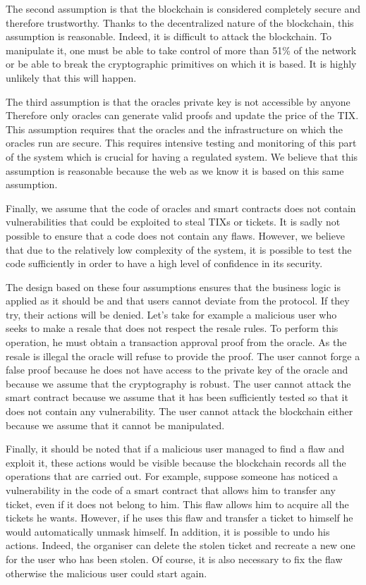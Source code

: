 \documentclass[a4paper,11pt,oneside]{report}
\begin{document}
The second assumption is that the blockchain is considered completely secure and therefore trustworthy. Thanks to the decentralized nature of the blockchain, this assumption is reasonable. Indeed, it is difficult to attack the blockchain. To manipulate it, one must be able to take control of more than 51\% of the network or be able to break the cryptographic primitives on which it is based. It is highly unlikely that this will happen.

The third assumption is that the oracles private key is not accessible by anyone Therefore only oracles can generate valid proofs and update the price of the TIX. This assumption requires that the oracles and the infrastructure on which the oracles run are secure. This requires intensive testing and monitoring of this part of the system which is crucial for having a regulated system. We believe that this assumption is reasonable because the web as we know it is based on this same assumption.

Finally, we assume that the code of oracles and smart contracts does not contain vulnerabilities that could be exploited to steal TIXs or tickets. It is sadly not possible to ensure that a code does not contain any flaws. However, we believe that due to the relatively low complexity of the system, it is possible to test the code sufficiently in order to have a high level of confidence in its security.

The design based on these four assumptions ensures that the business logic is applied as it should be and that users cannot deviate from the protocol. If they try, their actions will be denied. Let's take for example a malicious user who seeks to make a resale that does not respect the resale rules. To perform this operation, he must obtain a transaction approval proof from the oracle. As the resale is illegal the oracle will refuse to provide the proof. The user cannot forge a false proof because he does not have access to the private key of the oracle and because we assume that the cryptography is robust. The user cannot attack the smart contract because we assume that it has been sufficiently tested so that it does not contain any vulnerability. The user cannot attack the blockchain either because we assume that it cannot be manipulated.

Finally, it should be noted that if a malicious user managed to find a flaw and exploit it, these actions would be visible because the blockchain records all the operations that are carried out. For example, suppose someone has noticed a vulnerability in the code of a smart contract that allows him to transfer any ticket, even if it does not belong to him. This flaw allows him to acquire all the tickets he wants. However, if he uses this flaw and transfer a ticket to himself he would automatically unmask himself. In addition, it is possible to undo his actions. Indeed, the organiser can delete the stolen ticket and recreate a new one for the user who has been stolen. Of course, it is also necessary to fix the flaw otherwise the malicious user could start again.
\end{document}

